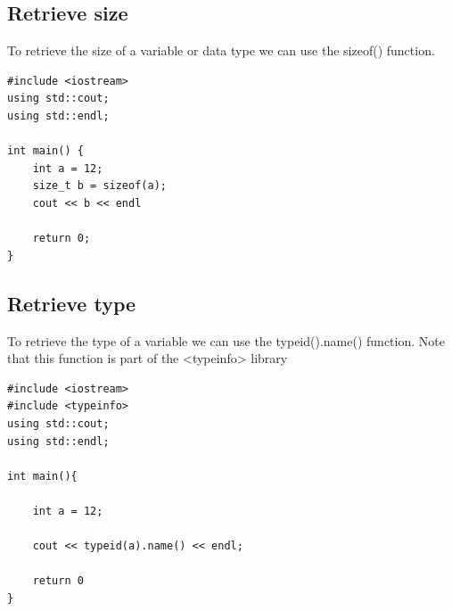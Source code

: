 \documentclass{report}
\begin{document}
    \pagebreak \bigbreak \noindent 
    \subsection{Retrieve size}
    \bigbreak \noindent 
    To retrieve the size of a variable or data type we can use the sizeof() function.
    \bigbreak \noindent 
    \sepline
    \begin{verbatim}
#include <iostream>
using std::cout;
using std::endl;

int main() {
    int a = 12;
    size_t b = sizeof(a);
    cout << b << endl

    return 0;
}
    \end{verbatim}
    \sepline
    \bigbreak \noindent 

    \bigbreak \noindent \bigbreak \noindent 
    \subsection{Retrieve type}
    \bigbreak \noindent 
    To retrieve the type of a variable we can use the typeid().name() function. Note that this function is part of the <typeinfo> library
    \bigbreak \noindent 
    \sepline
    \begin{verbatim}
#include <iostream>
#include <typeinfo>
using std::cout;
using std::endl;

int main(){

    int a = 12;

    cout << typeid(a).name() << endl;

    return 0
}
    \end{verbatim}
    \sepline
    \pagebreak \bigbreak \noindent 
\end{document}
